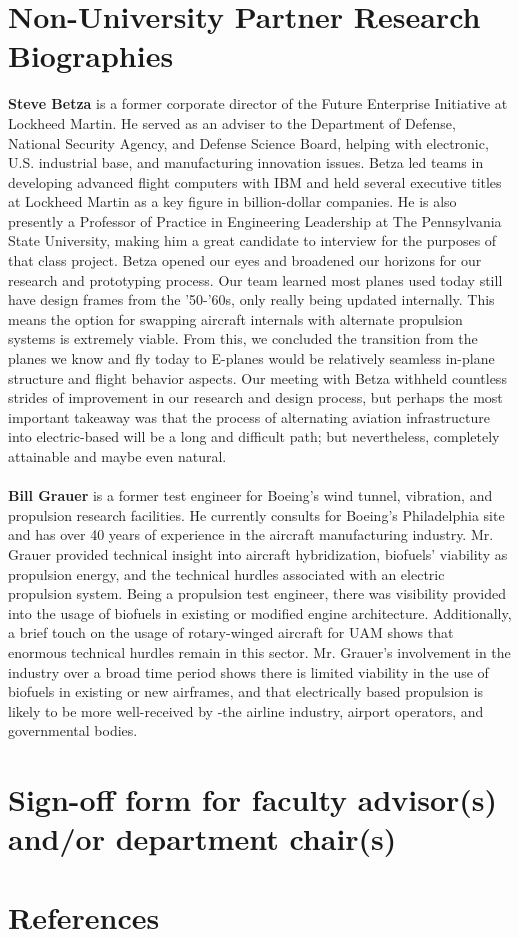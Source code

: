 \documentclass{article}
\begin{document}
\newpage
\section{Non-University Partner Research Biographies}\label{apxC}
\begin{singlespace}
\noindent\textbf{Steve Betza} is a former corporate director of the Future Enterprise Initiative at Lockheed Martin. 
He served as an adviser to the Department of Defense, National Security Agency, and Defense Science Board, helping with electronic, U.S. industrial base, and manufacturing innovation issues. 
Betza led teams in developing advanced flight computers with IBM and held several executive titles at Lockheed Martin as a key figure in billion-dollar companies. 
He is also presently a Professor of Practice in Engineering Leadership at The Pennsylvania State University, making him a great candidate to interview for the purposes of that class project. 
Betza opened our eyes and broadened our horizons for our research and prototyping process. 
Our team learned most planes used today still have design frames from the '50-'60s, only really being updated internally. 
This means the option for swapping aircraft internals with alternate propulsion systems is extremely viable. 
From this, we concluded the transition from the planes we know and fly today to E-planes would be relatively seamless in-plane structure and flight behavior aspects. 
Our meeting with Betza withheld countless strides of improvement in our research and design process, but perhaps the most important takeaway was that the process of alternating aviation infrastructure into electric-based will be a long and difficult path; but nevertheless, completely attainable and maybe even natural.\\~\\
\noindent\textbf{Bill Grauer} is a former test engineer for Boeing's wind tunnel, vibration, and propulsion research facilities.
He currently consults for Boeing’s Philadelphia site and has over 40 years of experience in the aircraft manufacturing industry. 
Mr. Grauer provided technical insight into aircraft hybridization, biofuels' viability as propulsion energy, and the technical hurdles associated with an electric propulsion system. 
Being a propulsion test engineer, there was visibility provided into the usage of biofuels in existing or modified engine architecture. 
Additionally, a brief touch on the usage of rotary-winged aircraft for UAM shows that enormous technical hurdles remain in this sector. 
Mr. Grauer’s involvement in the industry over a broad time period shows there is limited viability in the use of biofuels in existing or new airframes, and that electrically based propulsion is likely to be more well-received by -the airline industry, airport operators, and governmental bodies. 

\end{singlespace}

\section{Sign-off form for faculty advisor(s) and/or department chair(s)}\label{apxD}
\blindtext
\section{References}
\printbibliography[heading = none]
\cite{fuelSpecs}
\end{document}
